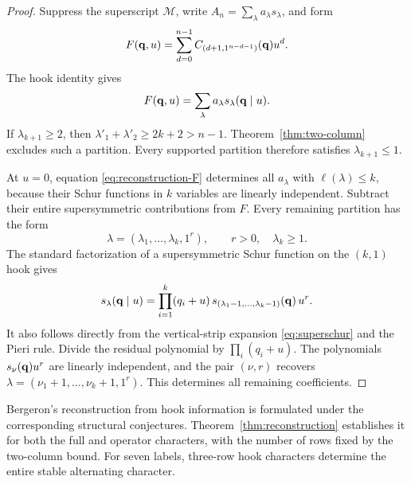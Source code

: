 \begin{proof}
Suppress the superscript $\mathcal M$, write
$A_n=\sum_\lambda a_\lambda s_\lambda$, and form
\[
 F(\mathbf q,u)=\sum_{d=0}^{n-1}
 C_{(d+1,1^{n-d-1})}(\mathbf q)u^d.
\]
The hook identity gives
\begin{equation}\label{eq:reconstruction-F}
 F(\mathbf q,u)=\sum_\lambda a_\lambda
                         s_\lambda(\mathbf q\mid u).
\end{equation}
If $\lambda_{k+1}\geq2$, then
$\lambda'_1+\lambda'_2\geq2k+2>n-1$.
Theorem~\ref{thm:two-column} excludes such a
partition.  Every supported partition therefore
satisfies $\lambda_{k+1}\leq1$.

At $u=0$, equation \eqref{eq:reconstruction-F}
determines all $a_\lambda$ with $\ell(\lambda)\leq k$,
because their Schur functions in $k$ variables
are linearly independent.  Subtract their entire
supersymmetric contributions from $F$.
Every remaining partition has the form
\[
 \lambda=(\lambda_1,\ldots,\lambda_k,1^r),
       \qquad r>0,\quad\lambda_k\geq1.
\]
The standard factorization of a supersymmetric
Schur function on the $(k,1)$ hook gives
\begin{equation}\label{eq:super-factorization}
 s_\lambda(\mathbf q\mid u)
    =\prod_{i=1}^k(q_i+u)\,
       s_{(\lambda_1-1,\ldots,\lambda_k-1)}(\mathbf q)\,u^r.
\end{equation}
It also follows directly from the vertical-strip
expansion \eqref{eq:superschur} and the Pieri rule.
Divide the residual polynomial by
$\prod_i(q_i+u)$.
The polynomials $s_\nu(\mathbf q)u^r$ are linearly
independent, and the pair $(\nu,r)$ recovers
$\lambda=(\nu_1+1,\ldots,\nu_k+1,1^r)$.
This determines all remaining coefficients.
\end{proof}

Bergeron's reconstruction from hook information
\cite[Section~3.1]{Bergeron} is formulated under the corresponding
structural conjectures.  Theorem~\ref{thm:reconstruction} establishes
it for both the full and operator characters, with the number of
rows fixed by the two-column bound.  For seven labels, three-row
hook characters determine the entire stable alternating character.
